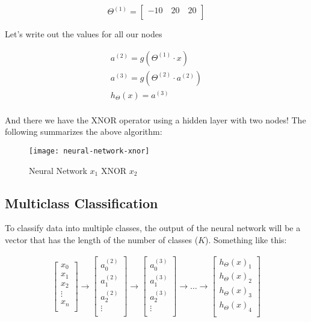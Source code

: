 $$\Theta^{(1)} = \begin{bmatrix}
	-10 \quad 20 \quad 20 \\
\end{bmatrix}$$

Let's write out the values for all our nodes

\begin{align*}
	a^{(2)} = g(\Theta^{(1)} \cdot x) \\
	a^{(3)} = g(\Theta^{(2)} \cdot a^{(2)}) \\
	h_{\Theta}(x) = a^{(3)} \\
\end{align*}

And there we have the XNOR operator using a hidden layer with two nodes! The following summarizes the above algorithm:

\begin{figure}[h]
    \centering
    \texttt{[image: neural-network-xnor]}
    \caption{Neural Network $x_1 \text{ XNOR } x_2$}
    \label{fig:neural-network-xnor}
\end{figure}

\newpage
\subsection{Multiclass Classification}
To classify data into multiple classes, the output of the neural network will be a vector that has the length of the number of classes ($K$). Something like this:

\begin{align}
	\begin{bmatrix}
		x_0 \\
		x_1 \\
		x_2 \\
		\vdots \\
		x_n \\
	\end{bmatrix}
	\rightarrow
	\begin{bmatrix}
		a_0^{(2)} \\
		a_1^{(2)} \\
		a_2^{(2)} \\
		\vdots \\
	\end{bmatrix}
	\rightarrow
	\begin{bmatrix}
		a_0^{(3)} \\
		a_1^{(3)} \\
		a_2^{(3)} \\
		\vdots \\
	\end{bmatrix}
	\rightarrow
		\hdots
	\rightarrow
	\begin{bmatrix}
		h_{\Theta}(x)_1 \\
		h_{\Theta}(x)_2 \\
		h_{\Theta}(x)_3 \\
		h_{\Theta}(x)_4 \\
	\end{bmatrix}
\end{align}

